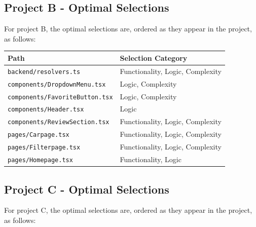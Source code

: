 \subsection{Project B - Optimal Selections}
For project B, the optimal selections are, ordered as they appear in the project, as follows: \\ 


\begin{center}
\begin{tabularx}{\textwidth}{>{\hsize=1.1\hsize}X >{\hsize=0.9\hsize}X}
    \toprule
    \textbf{Path} & \textbf{Selection Category} \\
    \midrule
    \texttt{backend/resolvers.ts} & Functionality,  Logic, Complexity  \\
    \texttt{components/DropdownMenu.tsx} & Logic, Complexity  \\
    \texttt{components/FavoriteButton.tsx} & Logic, Complexity  \\
    \texttt{components/Header.tsx} & Logic  \\
    \texttt{components/ReviewSection.tsx} & Functionality,  Logic, Complexity  \\
    \texttt{pages/Carpage.tsx} & Functionality,  Logic, Complexity  \\
    \texttt{pages/Filterpage.tsx} & Functionality,  Logic, Complexity  \\ 
    \texttt{pages/Homepage.tsx} & Functionality,  Logic  \\
    \bottomrule
\end{tabularx}
\end{center}


\subsection{Project C - Optimal Selections}
For project C, the optimal selections are, ordered as they appear in the project, as follows: \\ 


